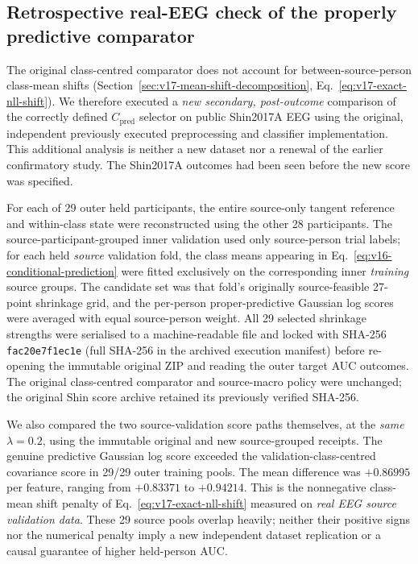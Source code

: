 \subsection{Retrospective real-EEG check of the properly predictive comparator}
\label{sec:v18-fair-predictive}
The original class-centred comparator does not account for
between-source-person class-mean shifts
(Section~\ref{sec:v17-mean-shift-decomposition}, Eq.~\eqref{eq:v17-exact-nll-shift}).
We therefore executed a \emph{new secondary, post-outcome} comparison
of the correctly defined $C_{\mathrm{pred}}$ selector on public
Shin2017A EEG using the original, independent previously executed
preprocessing and classifier implementation. This additional
analysis is neither a new dataset nor a renewal of the earlier
confirmatory study. The Shin2017A outcomes had been seen before
the new score was specified.

For each of 29 outer held participants, the entire source-only
tangent reference and within-class state were reconstructed using
the other 28 participants. The source-participant-grouped inner
validation used only source-person trial labels; for each held
\emph{source} validation fold, the class means appearing in
Eq.~\eqref{eq:v16-conditional-prediction} were fitted exclusively
on the corresponding inner \emph{training} source groups.
The candidate set was that fold's originally source-feasible
27-point shrinkage grid, and the per-person proper-predictive
Gaussian log scores were averaged with equal source-person
weight. All 29 selected shrinkage strengths were serialised to
a machine-readable file and locked with SHA-256
\texttt{fac20e7f1ec1e} (full SHA-256 in the archived execution manifest)
before re-opening the immutable original ZIP and reading the
outer target AUC outcomes. The original class-centred comparator
and source-macro policy were unchanged; the original Shin
score archive retained its previously verified SHA-256.



We also compared the two source-validation score
paths themselves, at the \emph{same} $\lambda=0.2$,
using the immutable original and new source-grouped
receipts. The genuine predictive Gaussian log score
exceeded the validation-class-centred covariance score
in 29/29 outer training pools. The mean difference
was $+0.86995$ per feature, ranging from $+0.83371$
to $+0.94214$. This is the nonnegative class-mean
shift penalty of Eq.~\eqref{eq:v17-exact-nll-shift}
measured on \emph{real EEG source validation data}.
These 29 source pools overlap heavily; neither their
positive signs nor the numerical penalty imply
a new independent dataset replication or a causal
guarantee of higher held-person AUC.


